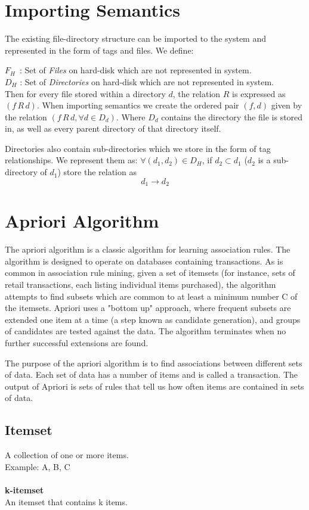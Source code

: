 \section{Importing Semantics}
The existing file-directory structure can be imported to the system and represented in the form of tags and files. We define: 

\noindent $F_{H} \, $  : Set of \emph{Files} on hard-disk which are not represented in system.\\
$D_{H}$ : Set of \emph{Directories} on hard-disk which are not represented in system. \\

\noindent Then for every file stored within a directory $d$, the relation $R$ is expressed as 
$(f  \, R  \, d)$.
When importing semantics we create the ordered pair $(f,d)$ given by the relation $(f  \, R \,  d, \forall d \in D_{d})$. Where $D_{d}$ contains the directory the file is stored in, as well as every parent directory of that directory itself.

\noindent Directories also contain sub-directories which we store in the form of tag relationships. We represent them as:
$\forall (d_{1}, d_{2}) \in D_{H}$, if $d_{2} \subset d_{1}$ ($d_{2}$ is a sub-directory of $d_{1}$) store the relation as
$$d_{1} \to d_{2}$$


\section{Apriori Algorithm}
The apriori algorithm is a classic algorithm for learning association rules. The
 algorithm is designed to operate on databases containing transactions. As is
common in association rule mining, given a set of itemsets (for instance, sets
of retail transactions, each listing individual items purchased), the algorithm
attempts to find subsets which are common to at least a minimum number C of the
itemsets. Apriori uses a "bottom up" approach, where frequent subsets are
extended one item at a time (a step known as candidate generation), and groups
of candidates are tested against the data. The algorithm terminates when no
further successful extensions are found.

The purpose of the apriori algorithm is to find associations between different sets of data.
Each set of data has a number of items and is called a transaction.
The output of Apriori is sets of rules that tell us how often items are contained in sets of data.

\subsection{Itemset}
A collection of one or more items. \\
Example: {A, B, C} \\ \\
\textbf{k-itemset} \\
An itemset that contains k items.

